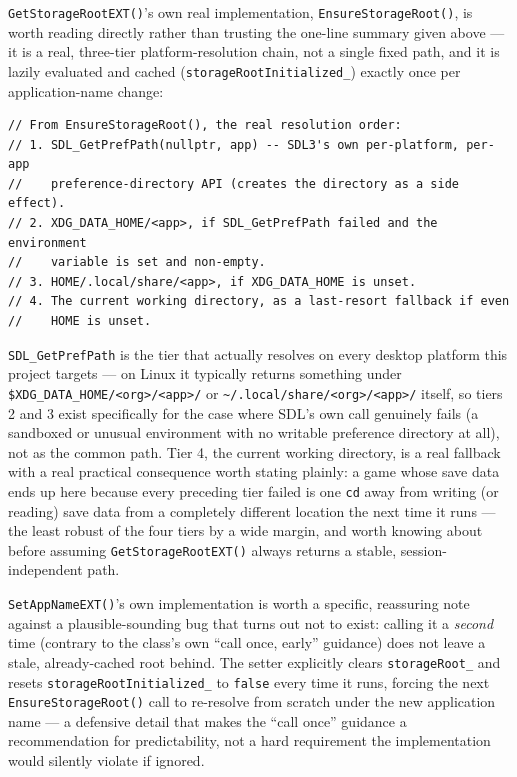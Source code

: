 \texttt{GetStorageRootEXT()}'s own real implementation, \texttt{EnsureStorageRoot()}, is worth
reading directly rather than trusting the one-line summary given above --- it is a real,
three-tier platform-resolution chain, not a single fixed path, and it is lazily evaluated and
cached (\texttt{storageRootInitialized\_}) exactly once per application-name change:

\begin{lstlisting}
// From EnsureStorageRoot(), the real resolution order:
// 1. SDL_GetPrefPath(nullptr, app) -- SDL3's own per-platform, per-app
//    preference-directory API (creates the directory as a side effect).
// 2. XDG_DATA_HOME/<app>, if SDL_GetPrefPath failed and the environment
//    variable is set and non-empty.
// 3. HOME/.local/share/<app>, if XDG_DATA_HOME is unset.
// 4. The current working directory, as a last-resort fallback if even
//    HOME is unset.
\end{lstlisting}

\texttt{SDL\_GetPrefPath} is the tier that actually resolves on every desktop platform this
project targets --- on Linux it typically returns something under
\texttt{\$XDG\_DATA\_HOME/<org>/<app>/} or \texttt{\textasciitilde/.local/share/<org>/<app>/} itself,
so tiers 2 and 3 exist specifically for the case where SDL's own call genuinely fails (a
sandboxed or unusual environment with no writable preference directory at all), not as the
common path. Tier 4, the current working directory, is a real fallback with a real practical
consequence worth stating plainly: a game whose save data ends up here because every preceding
tier failed is one \texttt{cd} away from writing (or reading) save data from a completely
different location the next time it runs --- the least robust of the four tiers by a wide
margin, and worth knowing about before assuming \texttt{GetStorageRootEXT()} always returns a
stable, session-independent path.

\texttt{SetAppNameEXT()}'s own implementation is worth a specific, reassuring note against a
plausible-sounding bug that turns out not to exist: calling it a \emph{second} time (contrary
to the class's own ``call once, early'' guidance) does not leave a stale, already-cached root
behind. The setter explicitly clears \texttt{storageRoot\_} and resets
\texttt{storageRootInitialized\_} to \texttt{false} every time it runs, forcing the next
\texttt{EnsureStorageRoot()} call to re-resolve from scratch under the new application name ---
a defensive detail that makes the ``call once'' guidance a recommendation for predictability,
not a hard requirement the implementation would silently violate if ignored.

